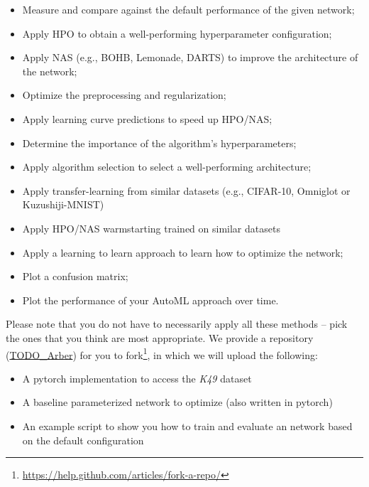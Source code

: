 \documentclass[10pt,a4paper]{article}
\begin{document}
		\begin{itemize}
			\item Measure and compare against the default performance of the given network;
			\item Apply HPO to obtain a well-performing hyperparameter configuration;
			\item Apply NAS (e.g., BOHB, Lemonade, DARTS) to improve the architecture of the network;
			\item Optimize the preprocessing and regularization;
			\item Apply learning curve predictions to speed up HPO/NAS;
			\item Determine the importance of the algorithm's hyperparameters;
			\item Apply algorithm selection to select a well-performing architecture;
			\item Apply transfer-learning from similar datasets (e.g., CIFAR-10, Omniglot or Kuzushiji-MNIST)
			\item Apply HPO/NAS warmstarting trained on similar datasets 
			\item Apply a learning to learn approach to learn how to optimize the network;
			\item Plot a confusion matrix;
			\item Plot the performance of your AutoML approach over time.
		\end{itemize}
		\noindent
		Please note that you do not have to necessarily apply all these methods -- pick the ones that you think are most appropriate.
		We provide a repository (\url{TODO_Arber}) for you to fork\footnote{\url{https://help.github.com/articles/fork-a-repo/}}, in which we will upload the following:
		\begin{itemize}
			\item A pytorch implementation to access the \textit{K49} dataset
			\item A baseline parameterized network to optimize (also written in pytorch)
			\item An example script to show you how to train and evaluate an network based on the default configuration
		\end{itemize}
\end{document}
